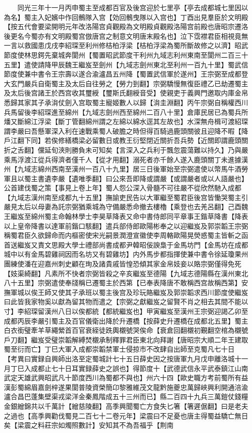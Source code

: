 　　同光三年十一月丙申蜀主至成都百官及後宫迎於七里亭【亭去成都城七里因以為名】蜀主入妃嬪中作回鶻隊入宫【効回鶻曳隊以入宫也】丁酉出見羣臣於文明殿【按五代會要梁開明元年改洛陽宫貞觀殿為文明殿貞觀殿洛陽宫前殿也唐昭宗遷洛後更名今蜀亦有文明殿蜀宫倣唐宫之制意文明唐末殿名也】泣下霑襟君臣相視竟無一言以救國患戊戌李紹琛至利州修桔柏浮梁【桔柏浮梁為蜀所斷故修之以濟】昭武節度使林思鍔先棄城奔閬州【蜀置昭武節度干利州九域志利州東南至閬州二百三十五里】遣使請降甲辰魏王繼岌至劍州【九域志劍州東北至利州一百九十里】蜀武信節度使兼中書令王宗壽以遂合渝瀘昌五州降【蜀置武信軍於遂州】王宗弼至成都登大玄門嚴兵自衛蜀主及太后自往勞之【勞力到翻】宗弼驕慢無復臣禮乙已劫遷蜀主及太后後宫諸王於西宫收其璽綬【璽斯氏翻綬音受】使親吏于義興門邀取内庫金帛悉歸其家其子承㳙仗劍入宫取蜀主寵姬數人以歸【㳙圭淵翻】丙午宗弼自稱權西川兵馬留後李紹琛進至綿州【九域志劍州西至綿州二百八十里】倉庫民居已為蜀兵所燔又斷綿江浮梁【斷丁管翻綿州謂之左綿以綿水逕其左故也】水深無舟楫可渡紹琛謂李嚴曰吾懸軍深入利在速戰乘蜀人破膽之時但得百騎過鹿頭關彼且迎降不暇【降戶江翻下同】若俟修繕橋梁必留數日或教王衍堅閉近關折吾兵勢【近關即謂鹿頭關折之舌翻】儻延旬浹則勝負未可知矣【言深入之兵利于飄忽震蕩難以持久】乃與嚴乘馬浮渡江從兵得濟者僅千人【從才用翻】溺死者亦千餘人遂入鹿頭關丁未進據漢州【九域志綿州西南至漢州一百八十九里】居三日後軍始至宗弼遣使以幣馬牛酒勞軍且以蜀主書遺李嚴【遺唯季翻】曰公來吾即降或謂嚴【或謂嚴者或以人語嚴也】公首建伐蜀之策【事見上卷上年】蜀人怨公深入骨髓不可往嚴不從欣然馳入成都【九域志漢州南至成都九十五里】撫諭吏民告以大軍繼至蜀君臣後宫皆慟哭蜀主引嚴見太后以母妻為託宗弼猶乘城為守備嚴悉命撤去樓櫓【乘登也去羌呂翻】己酉魏王繼岌至綿州蜀主命翰林學士李昊草降表又命中書侍郎同平章事王鍇草降書【降表以上皇帝降書以達軍前鍇口駭翻】遣兵部侍郎歐陽彬奉之以迎繼岌及郭崇韜王宗弼稱蜀君臣久欲歸命而内樞密使宋光嗣景潤澄宣徽使李周輅歐陽晃熒惑蜀主皆斬之函首送繼岌又責文思殿大學士禮部尚書成都尹韓昭佞諛梟于金馬坊門【金馬坊在成都城中以有金馬碧雞祠因而名坊又有碧雞坊】内外馬步都指揮使兼中書令徐延瓊果州團練使潘在迎嘉州刺史顧在珣及諸貴戚皆惶恐傾其家金帛妓妾以賂宗弼僅得免死【妓渠綺翻】凡素所不快者宗弼皆殺之辛亥繼岌至德陽【九域志德陽縣在漢州東北八十五里】宗弼遣使奉牋稱已遷蜀主於西第【已奉表降唐不敢稱西宫故稱西第】安撫軍城以俟王師又使其子承班以蜀主後宫及珍玩賂繼岌及郭崇韜求西川節度使繼岌曰此皆我家物奚以獻為留其物而遣之【宗弼之獻繼岌之留賢不肖之相去其間不能以寸】李紹琛留漢州八日以俟都統【都統繼岌也】甲寅繼岌至漢州王宗弼迎謁乙卯至成都丙辰李嚴引蜀主及百官儀衛出降於升遷橋【按薛史升遷橋在成都北五里】蜀主白衣銜璧牽羊草繩縈首百官衰絰徒跣輿櫬號哭俟命【衰倉回翻櫬初覲翻空棺為櫬號戶刀翻】繼岌受璧崇韜解縛焚櫬承制釋罪君臣東北向拜謝【唐昭宗大順二年王建取蜀至衍而亡】丁巳大軍入成都崇韜禁軍士侵掠市不改肆自出師至克蜀凡七十日　【考異曰實録自興師出洛至定蜀城計七十五日薛史因之按唐軍九月戊申離洛城十一月丁巳入成都止七十日耳實録薛史之誤也】得節度十【武德武信永平武泰鎮江山南武定天雄武興昭武凡十節度西川為蜀都不與也】州六十四【歐史職方考前蜀所有益漢彭蜀綿眉嘉劍梓遂果閬普陵資榮簡卬黎雅維茂文龍黔施夔忠萬歸峽興利開通涪渝瀘合昌巴蓬集壁渠戎梁洋金秦鳳階成五十三州而已】縣二百四十九兵三萬鎧仗錢糧金銀繒錦共以千萬計【繒慈陵翻】高季興聞蜀亡方食失匕箸【箸遲倨翻】曰是老夫之過也【高季興勸伐蜀見二百七十二卷元年】梁震曰不足憂也唐主得蜀益驕亡無日矣【梁震之料莊宗如燭照數計】安知其不為吾福乎【荆南